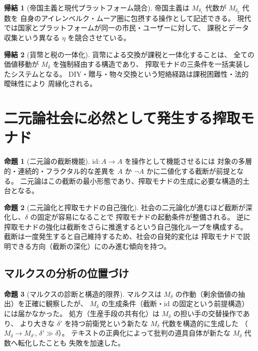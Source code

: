 \documentclass[11pt,a4paper]{ltjsarticle}
\newcommand{\Mdelta}{M_\delta}
\theoremstyle{definition}
\newtheorem{proposition}{命題}[section]
\newtheorem{corollary}{帰結}[section]
\begin{document}
\begin{corollary}[帝国主義と現代プラットフォーム競合]
帝国主義は $M_{\delta_1}$ 代数が $M_{\delta_2}$ 代数を
自身のアイレンベルク・ムーア圏に包摂する操作として記述できる。
現代では国家とプラットフォームが同一の市民・ユーザーに対して、
課税とデータ収集という異なる $\eta$ を競合させている。
\end{corollary}

\begin{corollary}[貨幣と税の一体化]
貨幣による交換が課税と一体化することは、
全ての価値移動が $\Mdelta$ を強制経由する構造であり、
搾取モナドの三条件を一括実装したシステムとなる。
DIY・贈与・物々交換という短絡経路は課税困難性・法的曖昧性により
周縁化される。
\end{corollary}

\section{二元論社会に必然として発生する搾取モナド}

\begin{proposition}[二元論の截断機能]
$\mathrm{id}: A \to A$ を操作として機能させるには
対象の多層的・連続的・フラクタル的な差異を $A$ か $\neg A$ かに二値化する截断が前提となる。
二元論はこの截断の最小形態であり、搾取モナドの生成に必要な構造的土台となる。
\end{proposition}

\begin{proposition}[二元論化と搾取モナドの自己強化]
社会の二元論化が進むほど截断が深化し、$\delta$ の固定が容易になることで
搾取モナドの起動条件が整備される。
逆に搾取モナドの強化は截断をさらに推進するという自己強化ループを構成する。
截断は一度発生すると自己維持するため、社会の自発的変化は
搾取モナドで説明できる方向（截断の深化）にのみ進む傾向を持つ。
\end{proposition}

\subsection{マルクスの分析の位置づけ}

\begin{proposition}[マルクスの診断と構造的限界]
マルクスは $\Mdelta$ の作動（剰余価値の抽出）を正確に観察したが、
$\Mdelta$ の生成条件（截断・$\mathrm{id}$ の固定という前提構造）には届かなかった。
処方（生産手段の共有化）は $\Mdelta$ の担い手の交替操作であり、
より大きな $\delta'$ を持つ前衛党という新たな $\Mdelta$ 代数を構造的に生成した
（$M_\delta \to M_{\delta'}$, $\delta' \gg \delta$）。
テキストの正典化によって批判の道具自体が新たな $\Mdelta$ 代数へ転化したことも
失敗を加速した。
\end{proposition}
\end{document}
